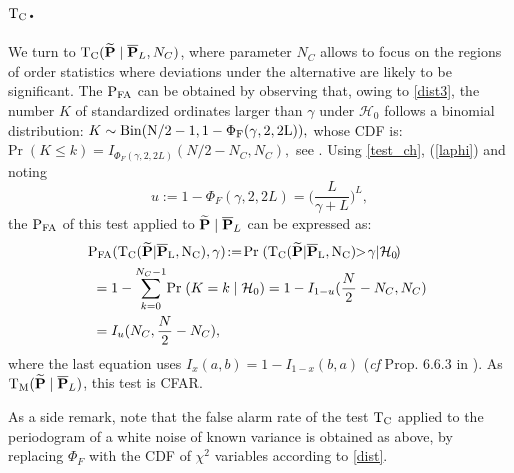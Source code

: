 \documentclass[journal]{IEEEtran}
\begin{document}
\subsection{${\rm T_C}$.}
\label{TC}
We turn to ${\rm T_C}({\bf \widetilde{\bf P}}\;|\;\overline{\bf P}_L,N_C) $, where parameter $N_C$ allows to focus on the regions of order statistics 
where  deviations under the alternative are likely to be  significant. The $\rm{P_{FA}}$ can be obtained by observing
 that, owing to \eqref{dist3}, the number $K$ of standardized ordinates larger than $\gamma$  under $\mathcal{H}_0$ follows a binomial distribution:
 {
$	 K\sim \rm{Bin}(N/2-1,1-\Phi_{F}(\gamma,2,2L)),$
  whose CDF is: 
 $	\textrm{Pr}\;(K\leq k)=I_{\Phi_{F}(\gamma,2,2L)}(N/2-N_C,N_C), $ see \cite{Abramowitz_1972}.
}
 Using \eqref{test_ch}, (\ref{laphi}) and noting
\begin{equation*}  
 	u :=  1-\Phi_{F}(\gamma,2,2L) = \Big( \frac{L}{\gamma+L} \Big)^L,
 \end{equation*}
the $\rm{P_{FA}}$ of this test applied to ${\bf \widetilde{\bf P}}\;|\;\overline{\bf P}_L$ can be expressed as:
\begin{equation}  
\begin{aligned} 
	&\!\!\rm{P_{FA}}({\rm T_C}( {\bf \widetilde{\bf P}}|\overline{\bf P}_L, N_C),\gamma) \!:=\! \textrm{Pr}\; ( {T_C  ({\bf \widetilde{\bf P}}|\overline{\bf P}_L,N_C)}\!\! > \!\gamma | {\cal{H}}_0\!)\! \\
	&= 1- { \sum_{k=0}^{N_C-1} } \textrm{Pr}\; ( K=k\;|\;{\cal{H}}_0) = 1 -  I_{1-u}( \frac{N}{2}-N_C, N_C)  \\
	
	&=   I_{u} (N_C, \frac{N}{2}-N_C),
\end{aligned}
\label{pfa_Tor}
 \end{equation}
 where the last equation uses   $I_x(a,b)=1-I_{1-x}(b,a)$  (\textit{cf} Prop. 6.6.3 in \cite{Abramowitz_1972}).
As ${\rm T_M}({\bf \widetilde{\bf P}}\;|\;\overline{\bf P}_L)$, this test is CFAR.

As a side remark, note that the false alarm rate of the test ${\rm T_C}$ applied to the periodogram of a white noise of known variance is obtained as above,
by replacing $\Phi_F$ with the CDF of $\chi^2$ variables according to \eqref{dist}.
\end{document}
